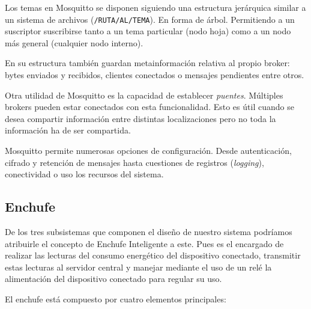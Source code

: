 \documentclass[a4paper,10pt]{article}
\begin{document}
Los temas en Mosquitto se disponen siguiendo una estructura jerárquica
similar a un sistema de archivos (\texttt{/RUTA/AL/TEMA}). En forma de
árbol. Permitiendo a un suscriptor suscribirse tanto a un tema
particular (nodo hoja) como a un nodo más general (cualquier nodo
interno).

En su estructura también guardan metainformación relativa al propio
broker: bytes enviados y recibidos, clientes conectados o mensajes
pendientes entre otros.

Otra utilidad de Mosquitto es la capacidad de establecer
\textit{puentes}. Múltiples brokers pueden estar conectados con esta
funcionalidad. Esto es útil cuando se desea compartir información
entre distintas localizaciones pero no toda la información ha de ser
compartida.

Mosquitto permite numerosas opciones de configuración. Desde
autenticación, cifrado y retención de mensajes hasta cuestiones de registros
(\textit{logging}), conectividad o uso los recursos del sistema.


\newpage

\subsection{Enchufe}\label{subsec:enchufe}

De los tres subsistemas que componen el diseño de nuestro sistema
podríamos atribuirle el concepto de Enchufe Inteligente a este. Pues
es el encargado de realizar las lecturas del consumo energético del
dispositivo conectado, transmitir estas lecturas al servidor central y
manejar mediante el uso de un relé la alimentación del dispositivo
conectado para regular su uso.

El enchufe está compuesto por cuatro elementos principales:
\end{document}
